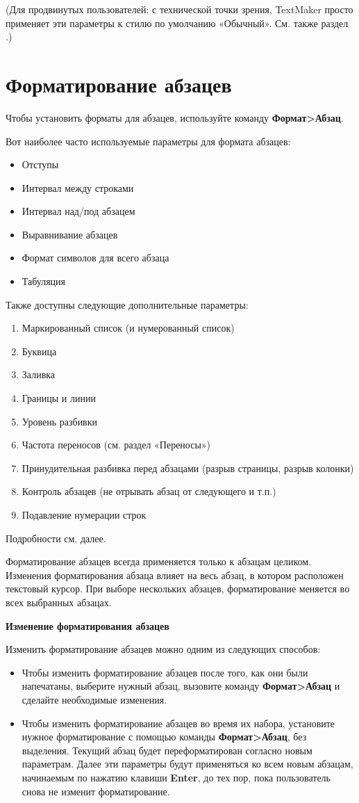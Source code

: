 ﻿\documentclass[a4paper,10pt]{article}
\begin{document}
(Для продвинутых пользователей: с технической точки зрения, TextMaker просто применяет эти параметры к стилю по умолчанию  «Обычный». См. также раздел .)

\section{Форматирование абзацев} \label{sec:фа}
Чтобы установить форматы для абзацев, используйте команду \textbf{Формат>Абзац}.

Вот наиболее часто используемые параметры для формата абзацев:
\begin{itemize}
 \item Отступы
 \item Интервал между строками
 \item Интервал над/под абзацем
 \item Выравнивание абзацев
 \item Формат символов для всего абзаца
 \item Табуляция
\end{itemize}

Также доступны следующие дополнительные параметры:
\begin{enumerate}
 \item Маркированный список (и нумерованный список)
 \item Буквица
 \item Заливка
 \item Границы и линии
 \item Уровень разбивки
 \item Частота переносов (см. раздел «Переносы»)
 \item Принудительная разбивка перед абзацами (разрыв страницы, разрыв колонки)
 \item Контроль абзацев (не отрывать абзац от следующего и т.п.)
 \item Подавление нумерации строк
\end{enumerate}

Подробности см. далее.

Форматирование абзацев всегда применяется только к абзацам целиком. Изменения форматирования абзаца влияет на весь абзац, в котором расположен текстовый курсор. При выборе нескольких абзацев, форматирование меняется во всех выбранных абзацах.

\textbf{Изменение форматирования абзацев}

Изменить форматирование абзацев можно одним из следующих способов:
\begin{itemize}
 \item Чтобы изменить форматирование абзацев после того, как они были напечатаны, выберите нужный абзац, вызовите команду \textbf{Формат>Абзац} и сделайте необходимые изменения.
 \item Чтобы изменить форматирование абзацев во время их набора, установите нужное форматирование с помощью команды \textbf{Формат>Абзац}, без выделения. Текущий абзац будет переформатирован согласно новым параметрам. Далее эти параметры будут применяться ко всем новым абзацам, начинаемым по нажатию клавиши \textbf{Enter}, до тех пор, пока пользователь снова не изменит форматирование.
\end{itemize}
\end{document}
